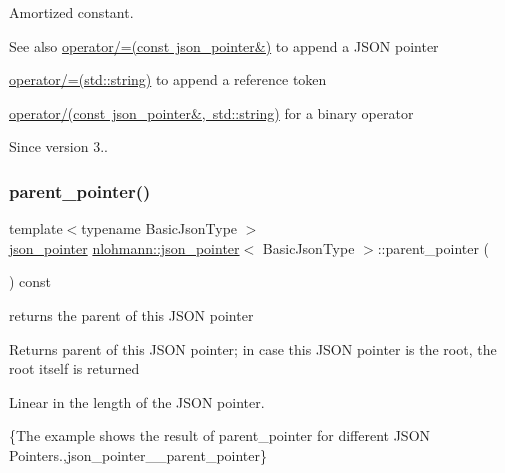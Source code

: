 Amortized constant.

\begin{DoxySeeAlso}{See also}
\mbox{\hyperlink{classnlohmann_1_1json__pointer_a7395bd0af29ac23fd3f21543c935cdfa}{operator/=(const json\+\_\+pointer\&)}} to append a J\+S\+ON pointer 

\mbox{\hyperlink{classnlohmann_1_1json__pointer_abdd21567b2b1d69329af0f520335e68b}{operator/=(std\+::string)}} to append a reference token 

\mbox{\hyperlink{classnlohmann_1_1json__pointer_a926c9065dbed1bedc17857a813f7a46f}{operator/(const json\+\_\+pointer\&, std\+::string)}} for a binary operator
\end{DoxySeeAlso}
\begin{DoxySince}{Since}
version 3.. 
\end{DoxySince}
\mbox{\label{classnlohmann_1_1json__pointer_afdaacce1edb7145e0434e014f0e8685a}} 
\subsubsection{\texorpdfstring{parent\+\_\+pointer()}{parent\_pointer()}}
{\footnotesize\ttfamily template$<$typename Basic\+Json\+Type $>$ \\
\mbox{\hyperlink{classnlohmann_1_1json__pointer}{json\+\_\+pointer}} \mbox{\hyperlink{classnlohmann_1_1json__pointer}{nlohmann\+::json\+\_\+pointer}}$<$ Basic\+Json\+Type $>$\+::parent\+\_\+pointer (\begin{DoxyParamCaption}{ }\end{DoxyParamCaption}) const\hspace{0.3cm}{\ttfamily [inline]}}



returns the parent of this J\+S\+ON pointer 

\begin{DoxyReturn}{Returns}
parent of this J\+S\+ON pointer; in case this J\+S\+ON pointer is the root, the root itself is returned
\end{DoxyReturn}
Linear in the length of the J\+S\+ON pointer.

\{The example shows the result of {\ttfamily parent\+\_\+pointer} for different J\+S\+ON Pointers.,json\+\_\+pointer\+\_\+\+\_\+parent\+\_\+pointer\}

